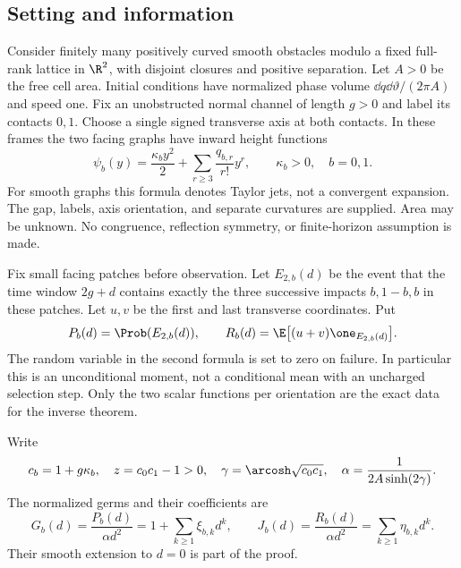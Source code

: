 \subsection{Setting and information}
Consider finitely many positively curved smooth obstacles modulo a fixed
full-rank lattice in $\R^2$, with disjoint closures and positive separation.
Let $A>0$ be the free cell area. Initial conditions have normalized phase
volume $\dd q\dd\vartheta/(2\pi A)$ and speed one. Fix an unobstructed
normal channel of length $g>0$ and label its contacts $0,1$.
Choose a single signed transverse axis at both contacts. In these frames
the two facing graphs have inward height functions
\begin{equation}\label{eq:graphs}
 \psi_b(y)=\frac{\kappa_b y^2}{2}
       +\sum_{r\ge3}\frac{q_{b,r}}{r!}y^r,\qquad \kappa_b>0,
       \quad b=0,1.
\end{equation}
For smooth graphs this formula denotes Taylor jets, not a convergent
expansion. The gap, labels, axis orientation, and separate curvatures are
supplied. Area may be unknown. No congruence, reflection symmetry, or
finite-horizon assumption is made.

Fix small facing patches before observation. Let $E_{2,b}(d)$ be the event
that the time window $2g+d$ contains exactly the three successive impacts
$b,1-b,b$ in these patches. Let $u,v$ be the first and last transverse
coordinates. Put
\begin{equation}\label{eq:rawdata}
 P_b(d)=\Prob(E_{2,b}(d)),\qquad
 R_b(d)=\E\bigl[(u+v)\one_{E_{2,b}(d)}\bigr].
\end{equation}
The random variable in the second formula is set to zero on failure.
In particular this is an unconditional moment, not a conditional mean
with an uncharged selection step. Only the two scalar functions per
orientation are the exact data for the inverse theorem.

Write
\begin{equation}\label{eq:leading}
 c_b=1+g\kappa_b,\quad z=c_0c_1-1>0,\quad
 \gamma=\arcosh\sqrt{c_0c_1},\quad
 \alpha=\frac1{2A\sinh(2\gamma)}.
\end{equation}
The normalized germs and their coefficients are
\begin{equation}\label{eq:coefficients}
 G_b(d)=\frac{P_b(d)}{\alpha d^2}=1+\sum_{k\ge1}\xi_{b,k}d^k,
 \qquad
 J_b(d)=\frac{R_b(d)}{\alpha d^2}=\sum_{k\ge1}\eta_{b,k}d^k.
\end{equation}
Their smooth extension to $d=0$ is part of the proof.

